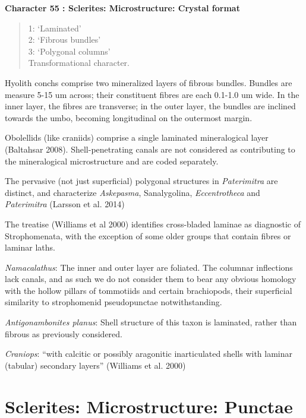 \documentclass[]{book}
\theoremstyle{definition}
\theoremstyle{definition}
\theoremstyle{definition}
\theoremstyle{remark}
\begin{document}
\textbf{Character 55 : Sclerites: Microstructure: Crystal format }

\begin{quote}
1: `Laminated'\\
2: `Fibrous bundles'\\
3: `Polygonal columns'\\
Transformational character.
\end{quote}

Hyolith conchs comprise two mineralized layers of fibrous bundles.
Bundles are measure 5-15 um across; their constituent fibres are each
0.1-1.0 um wide. In the inner layer, the fibres are transverse; in the
outer layer, the bundles are inclined towards the umbo, becoming
longitudinal on the outermost margin.

Obolellids (like craniids) comprise a single laminated mineralogical
layer (Baltahsar 2008). Shell-penetrating canals are not considered as
contributing to the mineralogical microstructure and are coded
separately.

The pervasive (not just superficial) polygonal structures in
\emph{Paterimitra} are distinct, and characterize \emph{Askepasma},
Sanalygolina, \emph{Eccentrotheca} and \emph{Paterimitra} (Larsson et
al. 2014)

The treatise (Williams et al 2000) identifies cross-bladed laminae as
diagnostic of Strophomenata, with the exception of some older groups
that contain fibres or laminar laths.

\emph{Namacalathus}: The inner and outer layer are foliated. The
columnar inflections lack canals, and as such we do not consider them to
bear any obvious homology with the hollow pillars of tommotiids and
certain brachiopods, their superficial similarity to strophomenid
pseudopunctae notwithstanding.

\emph{Antigonambonites planus}: Shell structure of this taxon is
laminated, rather than fibrous as previously considered.

\emph{Craniops}: ``with calcitic or possibly aragonitic inarticulated
shells with laminar (tabular) secondary layers'' (Williams et al. 2000)

\hypertarget{sclerites-microstructure-punctae}{%
\section*{Sclerites: Microstructure:
Punctae}\label{sclerites-microstructure-punctae}}
\end{document}
